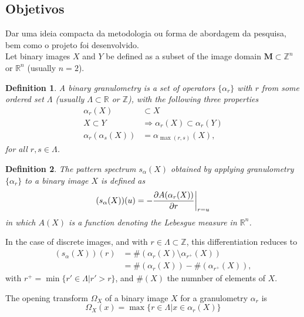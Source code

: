 \documentclass{sciposter}
\newtheorem{Def}{Definition}
\begin{document}
\begin{multicols}{3}
\section{Objetivos}
Dar uma ideia compacta da metodologia ou forma de abordagem da pesquisa, bem como o projeto foi desenvolvido.\\

Let binary images $X$ and $Y$ be defined as a subset of the image domain 
${\mathbf M}\subset {\mathbb Z}^n$ or ${\mathbb R}^n$ (usually $n=2$). 
\begin{Def}
A binary 
granulometry is a set of operators $\{\alpha_r\}$ with $r$ from some ordered 
set $\Lambda$ (usually $\Lambda \subset {\mathbb R}$ or ${\mathbb Z}$), with 
the following three properties
\begin{align}
   \alpha_r(X) & \subset  X \label{eq:antiext} \\
   X \subset Y & \Rightarrow \alpha_r(X) \subset \alpha_r(Y) 
   \label{eq:increasing} \\
   \alpha_r(\alpha_s(X)) & =  \alpha_{\max(r,s)}(X) \label{eq:idempot},
\end{align}   
for all $r,s \in \Lambda$.
\end{Def}

\begin{Def}
The pattern spectrum $s_{\alpha}(X)$ obtained by applying 
granulometry $\{\alpha_r\}$ to a binary image $X$ is defined as
\begin{equation}
    (s_{\alpha}(X))(u) = 
    - \frac{\partial A(\alpha_r(X))}{\partial r}\bigg{\vert}_{r=u}
\end{equation}
in which $A(X)$ is a function denoting the Lebesgue measure in 
${\mathbb R}^n$.
\end{Def} 
In the case of discrete images, and with $r \in \Lambda \subset {\mathbb Z}$, 
this differentiation reduces to
\begin{align}
    (s_{\alpha}(X))(r)  & = \#(\alpha_{r}(X) \setminus \alpha_{r^+}(X)) \\ 
                        & = \#(\alpha_{r}(X)) - \#(\alpha_{r^+}(X)), 
\end{align}
with $r^+ = \min\{ r' \in \Lambda \vert r' > r \}$, and $\#(X)$ the 
numnber of elements of $X$.

The opening transform \cite{Nacken:thesis} $\Omega_X$ of a binary image $X$ 
for a granulometry ${\alpha_r}$ is
\begin{equation}
  \Omega_X(x) = \max\{ r \in \Lambda \vert x \in \alpha_r(X) \}
\end{equation}


\end{multicols}
\end{document}
